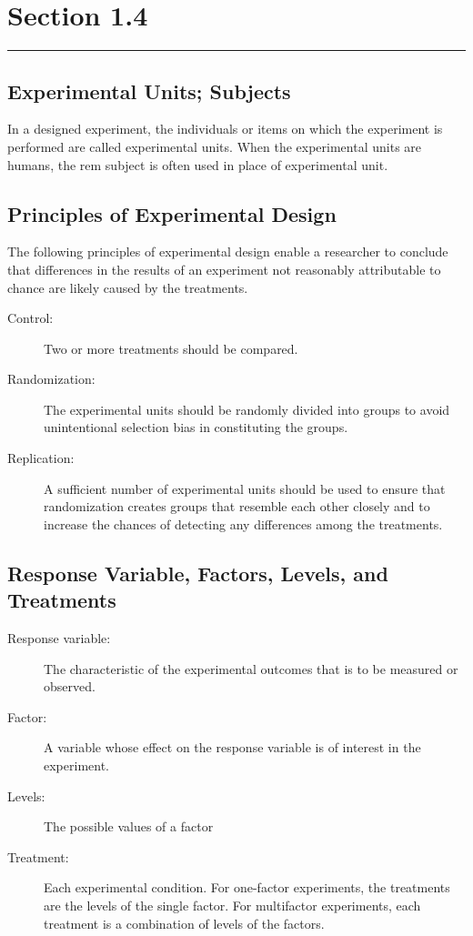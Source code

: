 \documentclass[12pt]{article}
\begin{document}
    \section*{Section 1.4}
    \noindent\rule{\textwidth}{0.4pt}
        \subsection*{Experimental Units; Subjects}
            In a designed experiment, the individuals or items on which the experiment
            is performed are called experimental units. When the experimental units are
            humans, the rem subject is often used in place of experimental unit.
        \subsection*{Principles of Experimental Design}
            The following principles of experimental design enable a researcher to
            conclude that differences in the results of an experiment not reasonably
            attributable to chance are likely caused by the treatments.
            \begin{description}
                \item[Control:] Two or more treatments should be compared.
                \item[Randomization:] The experimental units should be randomly divided
                into groups to avoid unintentional selection bias in constituting the
                groups.
                \item[Replication:] A sufficient number of experimental units should be
                used to ensure that randomization creates groups that resemble each other
                closely and to increase the chances of detecting any differences among the
                treatments.   
            \end{description}
        \subsection*{Response Variable, Factors, Levels, and Treatments}
            \begin{description}
                \item[Response variable:] The characteristic of the experimental outcomes
                that is to be measured or observed.
                \item[Factor:] A variable whose effect on the response variable is of
                interest in the experiment.
                \item[Levels:] The possible values of a factor  
                \item[Treatment:] Each experimental condition. For one-factor experiments,
                the treatments are the levels of the single factor. For multifactor
                experiments, each treatment is a combination of levels of the factors.
            \end{description}
\end{document}
